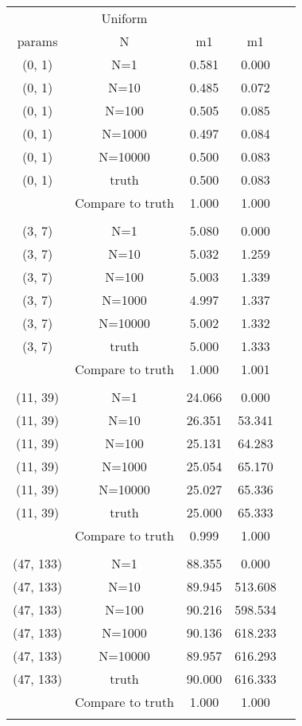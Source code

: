 

    \newpage
    \begin{table}[h!]
        \begin{center} {\footnotesize
        \begin{tabular}{ccccc}
        \hline
        & \multicolumn{1}{c}{ Uniform }  \\
        \multicolumn{1}{c}{params} & \multicolumn{1}{c}{N} & \multicolumn{1}{c}{m1} & \multicolumn{1}{c}{m1}\\
        \hline
        
(0, 1) & N=1 & 0.581 & 0.000 \\
(0, 1) & N=10 & 0.485 & 0.072 \\
(0, 1) & N=100 & 0.505 & 0.085 \\
(0, 1) & N=1000 & 0.497 & 0.084 \\
(0, 1) & N=10000 & 0.500 & 0.083 \\
(0, 1) & truth & 0.500 & 0.083 \\
 & Compare to truth & 1.000 & 1.000 \\
\\
(3, 7) & N=1 & 5.080 & 0.000 \\
(3, 7) & N=10 & 5.032 & 1.259 \\
(3, 7) & N=100 & 5.003 & 1.339 \\
(3, 7) & N=1000 & 4.997 & 1.337 \\
(3, 7) & N=10000 & 5.002 & 1.332 \\
(3, 7) & truth & 5.000 & 1.333 \\
 & Compare to truth & 1.000 & 1.001 \\
\\
(11, 39) & N=1 & 24.066 & 0.000 \\
(11, 39) & N=10 & 26.351 & 53.341 \\
(11, 39) & N=100 & 25.131 & 64.283 \\
(11, 39) & N=1000 & 25.054 & 65.170 \\
(11, 39) & N=10000 & 25.027 & 65.336 \\
(11, 39) & truth & 25.000 & 65.333 \\
 & Compare to truth & 0.999 & 1.000 \\
\\
(47, 133) & N=1 & 88.355 & 0.000 \\
(47, 133) & N=10 & 89.945 & 513.608 \\
(47, 133) & N=100 & 90.216 & 598.534 \\
(47, 133) & N=1000 & 90.136 & 618.233 \\
(47, 133) & N=10000 & 89.957 & 616.293 \\
(47, 133) & truth & 90.000 & 616.333 \\
 & Compare to truth & 1.000 & 1.000 \\
\\
\hline
        \end{tabular} }
        \end{center}
        \label{turns}
    \end{table}
    

